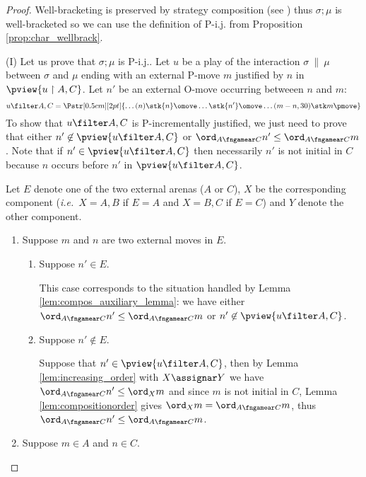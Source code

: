 \begin{proof}
Well-bracketing is preserved by strategy composition (see \cite[Proposition 2.5]{abramsky94full}) thus
$\sigma ; \mu$ is well-bracketed so we can use the definition of P-i.j. from Proposition \ref{prop:char_wellbrack}.

\noindent (I) Let us prove that $\sigma ; \mu$ is P-i.j..
Let $u$ be a play of the interaction $\sigma\ \|\ \mu$ between $\sigma$ and $\mu$
ending with an external P-move $m$
justified by $n$ in $\pview{u \upharpoonright A , C}$.
Let $n'$ be an external O-move occurring betweeen $n$ and $m$:
$$ u \filter A,C =
\Pstr[0.5cm][2pt]{ \ldots (n){\stk {n} \omove}  \ldots
 {\stk {n'} \omove}  \ldots  (m-n,30){\stk m \pmove}
}
$$
To show that $u \filter A,C$ is P-incrementally justified, we just need to prove that either $n'\not\in \pview{u \filter A,C}$ or $\ord_{A\fngamear C} n' \leq \ord_{A\fngamear C} m$.
Note that if $n'\in \pview{u \filter A,C}$
then necessarily $n'$ is not initial
in $C$ because $n$ occurs before $n'$ in
$\pview{u \filter A,C}$.

Let $E$ denote one of the two external arenas ($A$ or $C$), $X$ be
the corresponding component ({\it i.e.}~$X=A,B$ if $E=A$ and $X=B,C$
if $E=C$) and $Y$ denote the other component.
    \begin{enumerate}[1)]
    \item Suppose $m$ and $n$ are two external moves in $E$.

        \begin{enumerate}[{1}.a)]
        \item Suppose $n' \in E$.

        This case corresponds to the situation handled by Lemma \ref{lem:compos_auxiliary_lemma}: we have either $\ord_{A\fngamear C} n' \leq \ord_{A\fngamear C} m$
        or $n' \not\in \pview{u \filter A,C}$.

        \item Suppose $n' \not\in E$.

        Suppose that $n' \in \pview{u\filter A,C}$, then by
        Lemma \ref{lem:increasing_order} with $X\assignar Y$ we have $ \ord_{A\fngamear C} n'  \leq \ord_X m$
        and since $m$ is not initial in $C$, Lemma \ref{lem:compositionorder} gives $\ord_X m = \ord_{A\fngamear C} m$, thus $\ord_{A\fngamear C} n' \leq \ord_{A\fngamear C} m$.
        \end{enumerate}

        \item \label{case:mA} Suppose $m \in A$ and $n \in C$.


\end{enumerate}
\end{proof}
